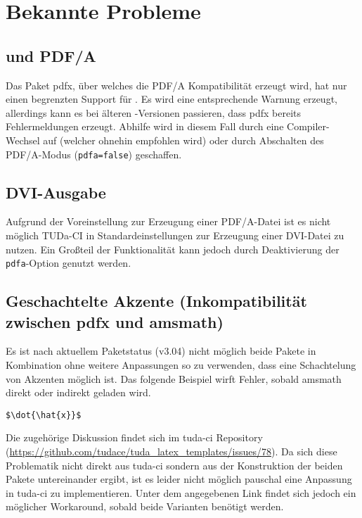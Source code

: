 \documentclass[
	ngerman,
	accentcolor=9c,%
	]{tudapub}
\let\code\texttt
\let\pck\textsf
\begin{document}
\section{Bekannte Probleme}

\subsection{\texorpdfstring{}{XeLaTeX} und PDF/A}
Das Paket \pck{pdfx}, über welches die PDF/A Kompatibilität erzeugt wird, hat nur einen begrenzten Support für .
Es wird eine entsprechende Warnung erzeugt, allerdings kann es bei älteren -Versionen passieren, dass \pck{pdfx} bereits Fehlermeldungen erzeugt. Abhilfe wird in diesem Fall durch eine Compiler-Wechsel auf  (welcher ohnehin empfohlen wird) oder durch Abschalten des PDF/A-Modus (\code{pdfa=false})  geschaffen.

\subsection{DVI-Ausgabe}
Aufgrund der Voreinstellung zur Erzeugung einer PDF/A-Datei ist es nicht möglich TUDa-CI in Standardeinstellungen zur Erzeugung einer DVI-Datei zu nutzen. Ein Großteil der Funktionalität kann jedoch durch Deaktivierung der \code{pdfa}-Option genutzt werden.


\subsection{Geschachtelte Akzente (Inkompatibilität zwischen pdfx und amsmath)}
Es ist nach aktuellem Paketstatus (v3.04) nicht möglich beide Pakete in Kombination ohne weitere Anpassungen so zu verwenden, dass eine Schachtelung von Akzenten möglich ist. Das folgende Beispiel wirft Fehler, sobald \pck{amsmath} direkt oder indirekt geladen wird.
\begin{verbatim}
$\dot{\hat{x}}$
\end{verbatim}

\noindent Die zugehörige Diskussion findet sich im tuda-ci Repository (\url{https://github.com/tudace/tuda_latex_templates/issues/78}). Da sich diese Problematik nicht direkt aus tuda-ci sondern aus der Konstruktion der beiden Pakete untereinander ergibt, ist es leider nicht möglich pauschal eine Anpassung in tuda-ci zu implementieren. Unter dem angegebenen Link findet sich jedoch ein möglicher Workaround, sobald beide Varianten benötigt werden.
\end{document}
